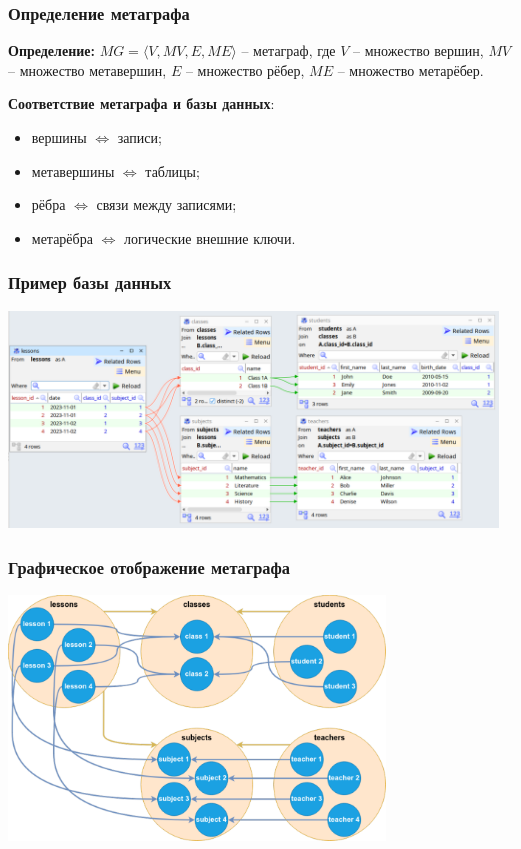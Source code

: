 \documentclass[pdf, hyperref={unicode}, aspectratio=169]{beamer}
\begin{document}
\begin{frame}
\frametitle{Определение метаграфа}
	\textbf{Определение:} $MG = \langle V, MV, E, ME \rangle$ -- метаграф, где $V$ -- множество вершин, $MV$ -- множество метавершин, $E$ -- множество рёбер, $ME$ -- множество метарёбер.

	\textbf{Соответствие метаграфа и базы данных}:
	\begin{itemize}
		\item вершины $\Leftrightarrow$ записи;
		\item метавершины $\Leftrightarrow$ таблицы;
		\item рёбра $\Leftrightarrow$ связи между записями;
		\item метарёбра $\Leftrightarrow$ логические внешние ключи.
	\end{itemize}
\end{frame}


\begin{frame}
\frametitle{Пример базы данных}
	\begin{center}
		\includegraphics[width = 13cm]{img/jailer-example-db}
	\end{center}
\end{frame}


\begin{frame}
\frametitle{Графическое отображение метаграфа}
	\begin{center}
		\includegraphics[height = 6.5cm]{img/drawio-metagraph}
	\end{center}
\end{frame}
\end{document}
